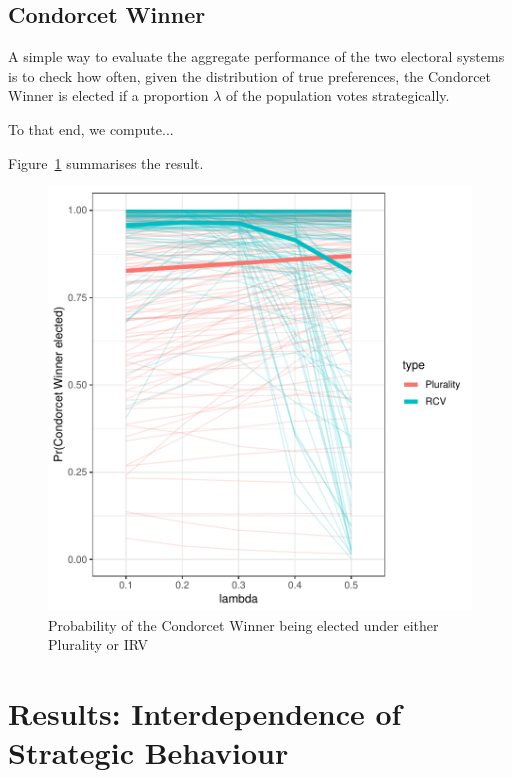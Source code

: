 \documentclass[11pt, letter]{article}
\begin{document}
\subsection{Condorcet Winner}

A simple way to evaluate the aggregate performance of the two electoral systems is to check how often, given the distribution of true preferences, the Condorcet Winner is elected if a proportion $\lambda$ of the population votes strategically. 

To that end, we compute...

Figure~\ref{fig:sv_condor} summarises the result.

\begin{figure}[!h]
	\centering
	\includegraphics[width = .8 \textwidth]{"../output/figures/condorcet_probs"}
	\caption{Probability of the Condorcet Winner being elected under either Plurality or IRV}
	\label{fig:sv_condor}
\end{figure}




\section{Results: Interdependence of Strategic Behaviour}
\end{document}
